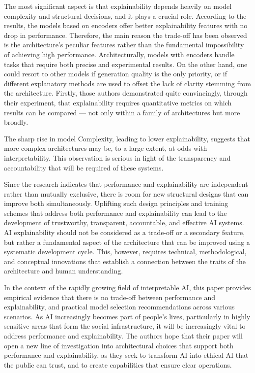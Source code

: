 \documentclass[preprint,12pt]{elsarticle}
\begin{document}
The most significant aspect is that explainability depends heavily on model complexity and structural decisions, and it plays a crucial role. According to the results, the models based on encoders offer better explainability features with no drop in performance. Therefore, the main reason the trade-off has been observed is the architecture's peculiar features rather than the fundamental impossibility of achieving high performance. Architecturally, models with encoders handle tasks that require both precise and experimental results. On the other hand, one could resort to other models if generation quality is the only priority, or if different explanatory methods are used to offset the lack of clarity stemming from the architecture. Firstly, those authors demonstrated quite convincingly, through their experiment, that explainability requires quantitative metrics on which results can be compared — not only within a family of architectures but more broadly.

The sharp rise in model Complexity, leading to lower explainability, suggests that more complex architectures may be, to a large extent, at odds with interpretability. This observation is serious in light of the transparency and accountability that will be required of these systems.

Since the research indicates that performance and explainability are independent rather than mutually exclusive, there is room for new structural designs that can improve both simultaneously. Uplifting such design principles and training schemes that address both performance and explainability can lead to the development of trustworthy, transparent, accountable, and effective AI systems. AI explainability should not be considered as a trade-off or a secondary feature, but rather a fundamental aspect of the architecture that can be improved using a systematic development cycle. This, however, requires technical, methodological, and conceptual innovations that establish a connection between the traits of the architecture and human understanding.

In the context of the rapidly growing field of interpretable AI, this paper provides empirical evidence that there is no trade-off between performance and explainability, and practical model selection recommendations across various scenarios. As AI increasingly becomes part of people's lives, particularly in highly sensitive areas that form the social infrastructure, it will be increasingly vital to address performance and explainability. The authors hope that their paper will open a new line of investigation into architectural choices that support both performance and explainability, as they seek to transform AI into ethical AI that the public can trust, and to create capabilities that ensure clear operations.
\end{document}
